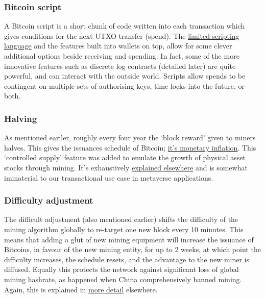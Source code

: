 \subsubsection{Bitcoin script}
A Bitcoin script is a short chunk of code written into each transaction which gives conditions for the next UTXO transfer (spend). The \href{https://bitcoin.sipa.be/miniscript/}{limited scripting language} and the features built into wallets on top, allow for some clever additional options beside receiving and spending. In fact, some of the more innovative features such as discrete log contracts (detailed later) are quite powerful, and can interact with the outside world. Scripts allow spends to be contingent on multiple sets of authorising keys, time locks into the future, or both.
\subsubsection{Halving}
As mentioned eariler, roughly every four year the `block reward' given to miners halves. This gives the issuances schedule of Bitcoin; \href{http://bashco.github.io/Bitcoin_Monetary_Inflation/}{it's monetary inflation}. This `controlled supply' feature was added to emulate the growth of physical asset stocks through mining. It's exhaustively \href{https://en.bitcoin.it/wiki/Controlled_supply}{explained elsewhere} and is somewhat immaterial to our transactional use case in metaverse applications.
\subsubsection{Difficulty adjustment}
The difficult adjustment (also mentioned earlier) shifts the difficulty of the mining algorithm globally to re-target one new block every 10 minutes. This means that adding a glut of new mining equipment will increase the issuance of Bitcoins, in favour of the new mining entity, for up to 2 weeks, at which point the difficulty increases, the schedule resets, and the advantage to the new miner is diffused. Equally this protects the network against significant loss of global mining hashrate, as happened when China comprehensively banned mining. Again, this is explained in \href{https://en.bitcoin.it/wiki/Difficulty}{more detail} elsewhere.
